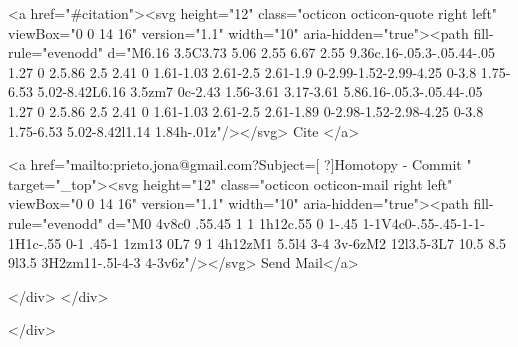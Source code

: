       <a  href="#citation"><svg height="12" class="octicon octicon-quote right left" viewBox="0 0 14 16" version="1.1" width="10" aria-hidden="true"><path fill-rule="evenodd" d="M6.16 3.5C3.73 5.06 2.55 6.67 2.55 9.36c.16-.05.3-.05.44-.05 1.27 0 2.5.86 2.5 2.41 0 1.61-1.03 2.61-2.5 2.61-1.9 0-2.99-1.52-2.99-4.25 0-3.8 1.75-6.53 5.02-8.42L6.16 3.5zm7 0c-2.43 1.56-3.61 3.17-3.61 5.86.16-.05.3-.05.44-.05 1.27 0 2.5.86 2.5 2.41 0 1.61-1.03 2.61-2.5 2.61-1.89 0-2.98-1.52-2.98-4.25 0-3.8 1.75-6.53 5.02-8.42l1.14 1.84h-.01z"/></svg> Cite
      </a>

      <a href="mailto:prieto.jona@gmail.com?Subject=[ ?]Homotopy - Commit " target="_top"><svg height="12" class="octicon octicon-mail right left" viewBox="0 0 14 16" version="1.1" width="10" aria-hidden="true"><path fill-rule="evenodd" d="M0 4v8c0 .55.45 1 1 1h12c.55 0 1-.45 1-1V4c0-.55-.45-1-1-1H1c-.55 0-1 .45-1 1zm13 0L7 9 1 4h12zM1 5.5l4 3-4 3v-6zM2 12l3.5-3L7 10.5 8.5 9l3.5 3H2zm11-.5l-4-3 4-3v6z"/></svg> Send Mail</a>

    </div>
  </div>

</div>




